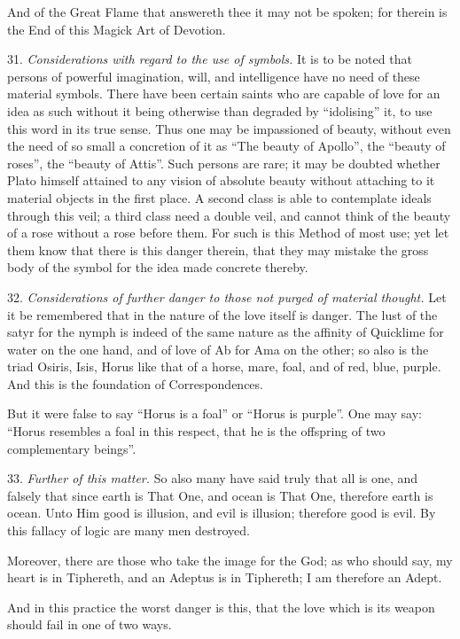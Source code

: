 And of the Great Flame that answereth thee it may not be spoken; for therein is the End of this Magick Art of Devotion.

31. \textit{Considerations with regard to the use of symbols.} It is to be noted that persons of powerful imagination, will, and intelligence have no need of these material symbols. There have been certain saints who are capable of love for an idea as such without it being otherwise than degraded by \enquote{idolising} it, to use this word in its true sense. Thus one may be impassioned of beauty, without even the need of so small a concretion of it as \enquote{The beauty of Apollo}, the \enquote{beauty of roses}, the \enquote{beauty of Attis}. Such persons are rare; it may be doubted whether Plato himself attained to any vision of absolute beauty without attaching to it material objects in the first place. A second class is able to contemplate ideals through this veil; a third class need a double veil, and cannot think of the beauty of a rose without a rose before them. For such is this Method of most use; yet let them know that there is this danger therein, that they may mistake the gross body of the symbol for the idea made concrete thereby.

32. \textit{Considerations of further danger to those not purged of material thought.} Let it be remembered that in the nature of the love itself is danger. The lust of the satyr for the nymph is indeed of the same nature as the affinity of Quicklime for water on the one hand, and of love of Ab for Ama on the other; so also is the triad Osiris, Isis, Horus like that of a horse, mare, foal, and of red, blue, purple. And this is the foundation of Correspondences.

But it were false to say \enquote{Horus is a foal} or \enquote{Horus is purple}. One may say: \enquote{Horus resembles a foal in this respect, that he is the offspring of two complementary beings}.

33. \textit{Further of this matter.} So also many have said truly that all is one, and falsely that since earth is That One, and ocean is That One, therefore earth is ocean. Unto Him good is illusion, and evil is illusion; therefore good is evil. By this fallacy of logic are many men destroyed.

Moreover, there are those who take the image for the God; as who should say, my heart is in Tiphereth, and an Adeptus is in Tiphereth; I am therefore an Adept.

And in this practice the worst danger is this, that the love which is its weapon should fail in one of two ways.

